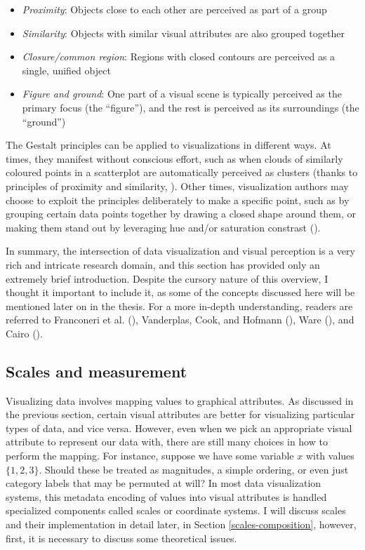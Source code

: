 \documentclass[
  openany]{book}
\providecommand{\tightlist}{%
  \setlength{\itemsep}{0pt}\setlength{\parskip}{0pt}}
\theoremstyle{definition}
\theoremstyle{definition}
\theoremstyle{definition}
\theoremstyle{definition}
\theoremstyle{remark}
\begin{document}
\begin{itemize}
\tightlist
\item
  \emph{Proximity}: Objects close to each other are perceived as part of a group
\item
  \emph{Similarity}: Objects with similar visual attributes are also grouped together
\item
  \emph{Closure/common region}: Regions with closed contours are perceived as a single, unified object
\item
  \emph{Figure and ground}: One part of a visual scene is typically perceived as the primary focus (the ``figure''), and the rest is perceived as its surroundings (the ``ground'')
\end{itemize}

The Gestalt principles can be applied to visualizations in different ways. At times, they manifest without conscious effort, such as when clouds of similarly coloured points in a scatterplot are automatically perceived as clusters (thanks to principles of proximity and similarity, ). Other times, visualization authors may choose to exploit the principles deliberately to make a specific point, such as by grouping certain data points together by drawing a closed shape around them, or making them stand out by leveraging hue and/or saturation constrast ().

In summary, the intersection of data visualization and visual perception is a very rich and intricate research domain, and this section has provided only an extremely brief introduction. Despite the cursory nature of this overview, I thought it important to include it, as some of the concepts discussed here will be mentioned later on in the thesis. For a more in-depth understanding, readers are referred to Franconeri et al. (), Vanderplas, Cook, and Hofmann (), Ware (), and Cairo ().

\subsection{Scales and measurement}\label{scales-measurement}

Visualizing data involves mapping values to graphical attributes. As discussed in the previous section, certain visual attributes are better for visualizing particular types of data, and vice versa. However, even when we pick an appropriate visual attribute to represent our data with, there are still many choices in how to perform the mapping. For instance, suppose we have some variable \(x\) with values \(\{ 1, 2, 3 \}\). Should these be treated as magnitudes, a simple ordering, or even just category labels that may be permuted at will? In most data visualization systems, this metadata encoding of values into visual attributes is handled specialized components called scales or coordinate systems. I will discuss scales and their implementation in detail later, in Section \ref{scales-composition}, however, first, it is necessary to discuss some theoretical issues.
\end{document}
